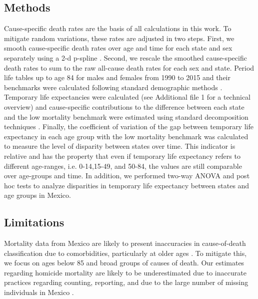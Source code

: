 \documentclass{bmcart}
\begin{document}
\subsection*{Methods}

Cause-specific death rates are the basis of all calculations in this work. To mitigate random variations, these rates are adjusted in two steps. First, we smooth cause-specific death rates over age and time for each state and sex separately using a 2-d p-spline \cite{GC2012}. Second, we rescale the smoothed cause-specific death rates to sum to the raw all-cause death rates for each sex and state. Period life tables up to
age 84 for males and females from 1990 to 2015 and their benchmarks were calculated following standard demographic methods \cite{HMDMP}. Temporary life expectancies were calculated \cite{arriaga1984} (see Additional file 1 for a technical overview) and  cause-specific contributions to the difference between
each state and the low mortality benchmark were estimated using
standard decomposition techniques \cite{horiuchi2008}. Finally, the coefficient of variation of the gap between temporary life expectancy in each age group with the low mortality benchmark was calculated to measure the level of disparity between states over time. This indicator is relative and has the property that even if temporary life expectancy refers to different age-ranges, i.e. 0-14,15-49, and 50-84, the values are still comparable over age-groups and time.  In addition, we performed two-way ANOVA and post hoc tests to analyze disparities in temporary life expectancy between states and age groups in Mexico. 



\subsection*{Limitations}
Mortality data from Mexico are
likely to present inaccuracies in cause-of-death classification due to
comorbidities, particularly at older ages \cite{hernandez2011assessing}. To mitigate this,
we focus on ages below 85 and broad groups of causes of death.
Our estimates regarding homicide mortality are likely to be
underestimated due to inaccurate practices regarding counting, reporting,
and due to the large number of missing individuals in Mexico \cite{HRW2011}.
\end{document}
